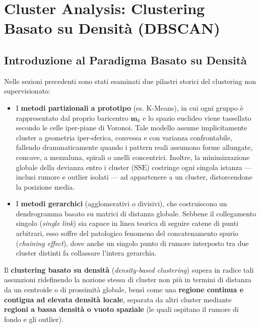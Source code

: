 \chapter{Cluster Analysis: Clustering Basato su Densità (DBSCAN)}
\label{chap:dm-density-dbscan}

\section{Introduzione al Paradigma Basato su Densità}
\label{sec:dm-dbscan-intro}

Nelle sezioni precedenti sono stati esaminati due pilastri storici del clustering non supervisionato:
\begin{itemize}
    \item I \textbf{metodi partizionali a prototipo} (es. K-Means), in cui ogni gruppo è rappresentato dal proprio baricentro $\mathbf{m}_k$ e lo spazio euclideo viene tassellato secondo le celle iper-piane di Voronoi. Tale modello assume implicitamente cluster a geometria iper-sferica, convessa e con varianza confrontabile, fallendo drammaticamente quando i pattern reali assumono forme allungate, concave, a mezzaluna, spirali o anelli concentrici. Inoltre, la minimizzazione globale della devianza entro i cluster ($\mathrm{SSE}$) costringe ogni singola istanza --- inclusi rumore e outlier isolati --- ad appartenere a un cluster, distorcendone la posizione media.
    \item I \textbf{metodi gerarchici} (agglomerativi o divisivi), che costruiscono un dendrogramma basato su matrici di distanza globale. Sebbene il collegamento singolo (\textit{single link}) sia capace in linea teorica di seguire catene di punti arbitrari, esso soffre del patologico fenomeno del concatenamento spurio (\textit{chaining effect}), dove anche un singolo punto di rumore interposto tra due cluster distinti fa collassare l'intera gerarchia.
\end{itemize}

Il \textbf{clustering basato su densità} (\textit{density-based clustering}) supera in radice tali assunzioni ridefinendo la nozione stessa di cluster non più in termini di distanza da un centroide o di prossimità globale, bensì come una \textbf{regione continua e contigua ad elevata densità locale}, separata da altri cluster mediante \textbf{regioni a bassa densità o vuoto spaziale} (le quali ospitano il rumore di fondo e gli outlier).

